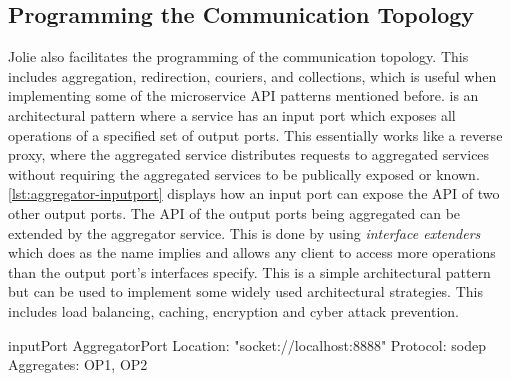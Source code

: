 \subsection{Programming the Communication Topology}
Jolie also facilitates the programming of the communication topology. This includes aggregation, redirection, couriers, and collections, which is useful when 
implementing some of the microservice API patterns mentioned before.
 is an architectural pattern where a service has an input port which exposes all operations of a specified set of output ports. This essentially works like a reverse proxy, where the aggregated service distributes requests to aggregated services without
requiring the aggregated services to be publically exposed or known. \cref{lst:aggregator-inputport} displays how an input port can expose the API of two other output ports.
The API of the output ports being aggregated can be extended by the aggregator service. This is done by using \textit{interface extenders} which does as the name implies and allows any client to access more operations than the output port's interfaces specify.
This is a simple architectural pattern but can be used to implement some widely used architectural strategies. This includes load balancing, caching, encryption and cyber attack prevention.

\begin{jolisting}[][caption={Input port which aggregates requests to some output ports, OP1 and OP2.}, label=lst:aggregator-inputport]
inputPort AggregatorPort {
    Location: "socket://localhost:8888"
    Protocol: sodep
    Aggregates: OP1, OP2
}
\end{jolisting}

